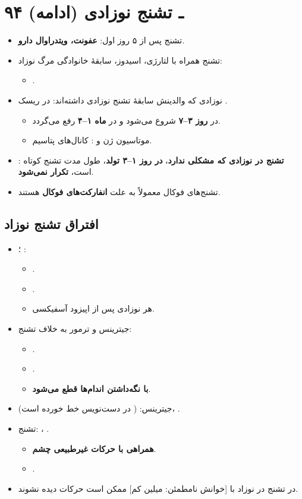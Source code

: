 \documentclass[12pt,a4paper]{article}
\begin{document}
\section*{۹۴ ـ تشنج نوزادی (ادامه)}
\begin{itemize}
\item تشنج پس از ۵ روز اول: \textbf{عفونت، ویتدراوال دارو}.
\item تشنج همراه با لتارژی، اسیدوز، سابقهٔ خانوادگی مرگ نوزاد:
  \begin{itemize}
  \item {}.
  \end{itemize}
\item نوزادی که والدینش سابقهٔ تشنج نوزادی داشته‌اند: در ریسک
  .
  \begin{itemize}
  \item در \textbf{روز ۳–۷} شروع می‌شود و در \textbf{ماه ۱–۴} رفع می‌گردد.
  \item موتاسیون ژن  و : کانال‌های پتاسیم.
  \end{itemize}
\item {}: \textbf{تشنج در نوزادی که مشکلی ندارد}، \textbf{در روز ۱–۳ تولد}، طول مدت تشنج کوتاه است، \textbf{تکرار نمی‌شود}.
\item تشنج‌های فوکال معمولاً به علت \textbf{انفارکت‌های فوکال} هستند.
\end{itemize}
\subsection*{افتراق تشنج نوزاد}
\begin{itemize}
\item {}؛ :
  \begin{itemize}
  \item {}.
  \item {}.
  \item هر نوزادی پس از اپیزود آسفیکسی.
  \end{itemize}
\item جیترینس و ترمور به خلاف تشنج:
  \begin{itemize}
  \item {}.
  \item \textbf{}.
  \item \textbf{با نگه‌داشتن اندام‌ها قطع می‌شود}.
  \end{itemize}
\item جیترینس: \textbf{} ( در دست‌نویس خط خورده است)، \textbf{}.
\item تشنج: \textbf{}، \textbf{}.
  \begin{itemize}
  \item \textbf{همراهی با حرکات غیرطبیعی چشم}.
  \item {}.
  \end{itemize}
\item در تشنج در نوزاد با [خوانش نامطمئن: میلین کم] ممکن است حرکات  دیده نشوند.
\end{itemize}
\end{document}
